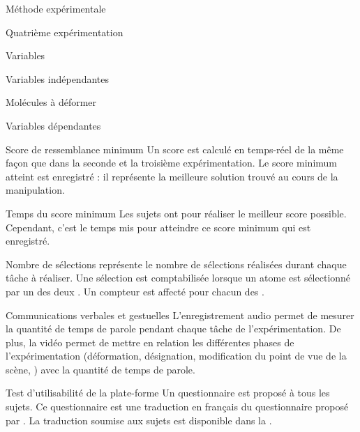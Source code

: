 \documentclass[myfrancais,ngerman,english,frenchb]{mythesis}
\begin{document}
\begin{mychapter}{Méthode expérimentale}
\begin{mysection}{Quatrième expérimentation}
\begin{mysubsection}{Variables}
\begin{mysubsubsection}{Variables indépendantes}
\begin{myparagraph}{ Molécules à déformer}
					\end{myparagraph}
				\end{mysubsubsection}
				\begin{mysubsubsection}{Variables dépendantes}
					\begin{myparagraph}{ Score de ressemblance minimum}
						Un score  est calculé en temps-réel de la même façon que dans la seconde et la troisième expérimentation.
						Le score minimum atteint est enregistré : il représente la meilleure solution trouvé au cours de la manipulation.
					\end{myparagraph}
					\begin{myparagraph}{ Temps du score  minimum}
						Les sujets ont  pour réaliser le meilleur score  possible.
						Cependant, c'est le temps mis pour atteindre ce score minimum qui est enregistré.
					\end{myparagraph}
					\begin{myparagraph}{ Nombre de sélections}
						 représente le nombre de sélections réalisées durant chaque tâche à réaliser.
						Une sélection est comptabilisée lorsque un atome est sélectionné par un des deux .
						Un compteur est affecté pour chacun des .
					\end{myparagraph}
					\begin{myparagraph}{ Communications verbales et gestuelles}
						L'enregistrement audio permet de mesurer la quantité de temps de parole pendant chaque tâche de l'expérimentation.
						De plus, la vidéo permet de mettre en relation les différentes phases de l'expérimentation (déformation, désignation, modification du point de vue de la scène, \myetc) avec la quantité de temps de parole.
					\end{myparagraph}
					\begin{myparagraph}{ Test d'utilisabilité de la plate-forme}
						Un questionnaire est proposé à tous les sujets.
						Ce questionnaire est une traduction en français du questionnaire  proposé par .
						La traduction soumise aux sujets est disponible dans la .

\end{myparagraph}
\end{mysubsubsection}
\end{mysubsection}
\end{mysection}
\end{mychapter}
\end{document}
